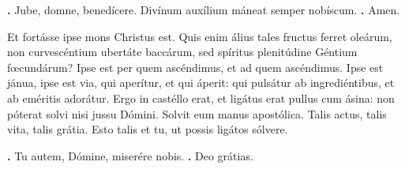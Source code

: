 \begin{small}
\textbf{\Vbar.} Jube, domne, benedícere.
  \hspace{.3em}
Divínum auxílium máneat semper nobíscum. \textbf{\Rbar.} Amen.
\end{small}


Et fortásse ipse mons Christus est. Quis enim álius tales fructus ferret oleárum, non curvescéntium ubertáte baccárum, sed spíritus plenitúdine Géntium fœcundárum? Ipse est per quem ascéndimus, et ad quem ascéndimus. Ipse est jánua, ipse est via, qui aperítur, et qui áperit: qui pulsátur ab ingrediéntibus, et ab eméritis adorátur. Ergo in castéllo erat, et ligátus erat pullus cum ásina: non póterat solvi nisi jussu Dómini. Solvit eum manus apostólica. Talis actus, talis vita, talis grátia. Esto talis et tu, ut possis ligátos sólvere.

\textbf{\Vbar.} Tu autem, Dómine, miserére nobis.
\textbf{\Rbar.} Deo grátias.


